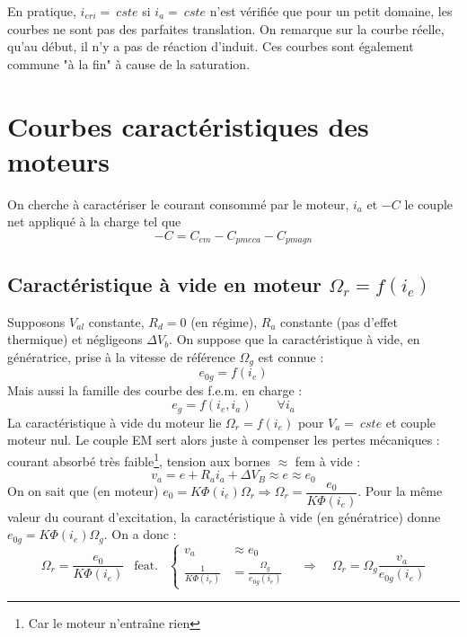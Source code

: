 		En pratique, $i_{eri} =\ cste$ si $i_a =\ cste$ n'est vérifiée que pour un 
		petit domaine, les courbes ne sont pas des parfaites translation. On remarque 
		sur la courbe réelle, qu'au début, il n'y a pas de réaction d'induit. Ces 
		courbes sont également commune "à la fin" à cause de la saturation.
		
		
\section{Courbes caractéristiques des moteurs}
On cherche à caractériser le courant consommé par le moteur, $i_a$ et $-C$ le couple 
net appliqué à la charge tel que
\begin{equation}
-C = C_{em} - C_{pmeca} - C_{pmagn}
\end{equation}
		
	\subsection{Caractéristique à vide en moteur $\Omega_r = f(i_e)$}
	Supposons $V_{al}$ constante, $R_d=0$ (en régime), $R_a$ constante (pas d'effet 
	thermique) et négligeons $\Delta V_b$. On suppose que la caractéristique à vide,
	en génératrice, 	prise à la vitesse de référence $\Omega_g$ est connue :
	\begin{equation}
	e_{0g} = f(i_e)
	\end{equation}
	Mais aussi la famille des courbe des f.e.m. en charge :
	\begin{equation}
	e_g = f(i_e,i_a)\qquad \forall i_a
	\end{equation}
	La caractéristique à vide du moteur lie $\Omega_r = f(i_e)$ pour $V_a=\ cste$ et 
	couple moteur nul. Le couple EM sert alors juste à compenser les pertes mécaniques : 
	courant absorbé très faible\footnote{Car le moteur n'entraîne rien}, tension aux 
	bornes $\approx$ fem à vide :
	\begin{equation}
	v_a = e+R_ai_a + \Delta V_B \approx e \approx e_0
	\end{equation}
	On on sait que (en moteur) $\displaystyle e_0 = K\Phi(i_e)\Omega_r \Longrightarrow 
	\Omega_r = 	\dfrac{e_0}{K\Phi(i_e)}$. Pour la même valeur du courant d’excitation, 
	la caractéristique à vide (en génératrice) donne $e_{0g} = K\Phi(i_e)\Omega_g$. On a donc :
	\begin{equation}
	\Omega_r = 	\dfrac{e_0}{K\Phi(i_e)}\ \ \text{ feat. }\ \ \left\{\begin{array}{ll}
	v_a &\approx e_0\\
	\frac{1}{K\Phi(i_e)} &= \frac{\Omega_g}{e_{0g}(i_e)}
	\end{array}\right.\quad  \Longrightarrow\quad \Omega_r = \Omega_g\dfrac{v_a}{e_{0g}(i_e)}
	\end{equation}
	
